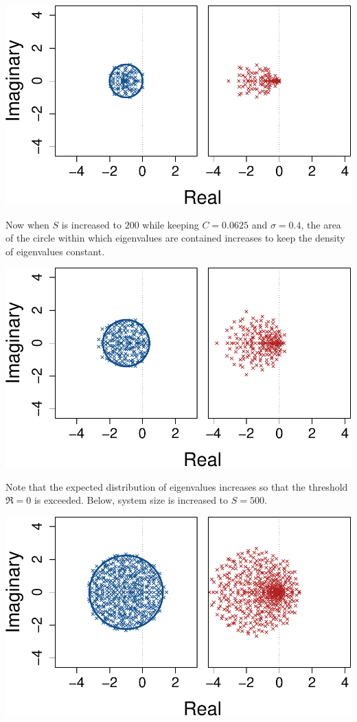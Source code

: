 \documentclass[]{article}
\begin{document}
\includegraphics{SI_files/figure-latex/unnamed-chunk-35-1.pdf}

Now when \(S\) is increased to \(200\) while keeping \(C = 0.0625\) and
\(\sigma = 0.4\), the area of the circle within which eigenvalues are
contained increases to keep the density of eigenvalues constant.

\includegraphics{SI_files/figure-latex/unnamed-chunk-36-1.pdf}

Note that the expected distribution of eigenvalues increases so that the
threshold \(\Re = 0\) is exceeded. Below, system size is increased to
\(S = 500\).

\includegraphics{SI_files/figure-latex/unnamed-chunk-37-1.pdf}
\end{document}
